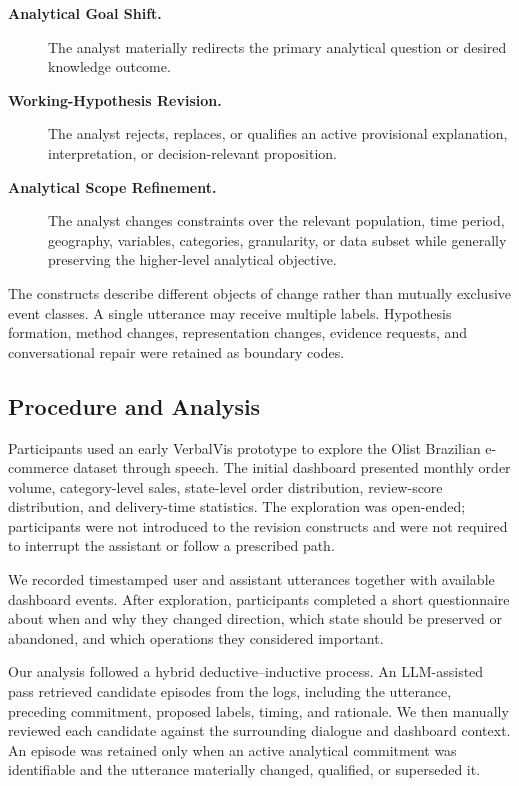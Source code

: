 \documentclass[journal]{IEEEtran}
\begin{document}
\begin{description}
\item[\textbf{Analytical Goal Shift.}]
The analyst materially redirects the primary analytical question or desired knowledge outcome.

\item[\textbf{Working-Hypothesis Revision.}]
The analyst rejects, replaces, or qualifies an active provisional explanation, interpretation, or decision-relevant proposition.

\item[\textbf{Analytical Scope Refinement.}]
The analyst changes constraints over the relevant population, time period, geography, variables, categories, granularity, or data subset while generally preserving the higher-level analytical objective.
\end{description}

The constructs describe different objects of change rather than mutually exclusive event classes. A single utterance may receive multiple labels. Hypothesis formation, method changes, representation changes, evidence requests, and conversational repair were retained as boundary codes.

\subsection{Procedure and Analysis}
\label{sec:formative-procedure}

Participants used an early VerbalVis prototype to explore the Olist Brazilian e-commerce dataset through speech. The initial dashboard presented monthly order volume, category-level sales, state-level order distribution, review-score distribution, and delivery-time statistics. The exploration was open-ended; participants were not introduced to the revision constructs and were not required to interrupt the assistant or follow a prescribed path.

We recorded timestamped user and assistant utterances together with available dashboard events. After exploration, participants completed a short questionnaire about when and why they changed direction, which state should be preserved or abandoned, and which operations they considered important.

Our analysis followed a hybrid deductive--inductive process. An LLM-assisted pass retrieved candidate episodes from the logs, including the utterance, preceding commitment, proposed labels, timing, and rationale. We then manually reviewed each candidate against the surrounding dialogue and dashboard context. An episode was retained only when an active analytical commitment was identifiable and the utterance materially changed, qualified, or superseded it.
\end{document}
